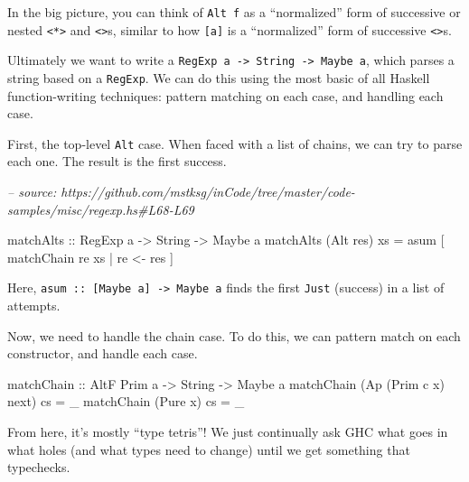 \documentclass[]{article}
\newenvironment{Shaded}{}{}
\newcommand{\CommentTok}[1]{\textcolor[rgb]{0.38,0.63,0.69}{\textit{#1}}}
\newcommand{\DataTypeTok}[1]{\textcolor[rgb]{0.56,0.13,0.00}{#1}}
\newcommand{\FunctionTok}[1]{\textcolor[rgb]{0.02,0.16,0.49}{#1}}
\newcommand{\NormalTok}[1]{#1}
\newcommand{\OtherTok}[1]{\textcolor[rgb]{0.00,0.44,0.13}{#1}}
\begin{document}
In the big picture, you can think of \texttt{Alt\ f} as a ``normalized'' form of
successive or nested \texttt{\textless{}*\textgreater{}} and
\texttt{\textless{}\textbar{}\textgreater{}}s, similar to how \texttt{{[}a{]}}
is a ``normalized'' form of successive \texttt{\textless{}\textgreater{}}s.

Ultimately we want to write a
\texttt{RegExp\ a\ -\textgreater{}\ String\ -\textgreater{}\ Maybe\ a}, which
parses a string based on a \texttt{RegExp}. We can do this using the most basic
of all Haskell function-writing techniques: pattern matching on each case, and
handling each case.

First, the top-level \texttt{Alt} case. When faced with a list of chains, we can
try to parse each one. The result is the first success.

\begin{Shaded}
\begin{Highlighting}[]
\CommentTok{-- source: https://github.com/mstksg/inCode/tree/master/code-samples/misc/regexp.hs#L68-L69}

\OtherTok{matchAlts ::} \DataTypeTok{RegExp}\NormalTok{ a }\OtherTok{->} \DataTypeTok{String} \OtherTok{->} \DataTypeTok{Maybe}\NormalTok{ a}
\NormalTok{matchAlts (}\DataTypeTok{Alt}\NormalTok{ res) xs }\FunctionTok{=}\NormalTok{ asum [ matchChain re xs }\FunctionTok{|}\NormalTok{ re }\OtherTok{<-}\NormalTok{ res  ]}
\end{Highlighting}
\end{Shaded}

Here, \texttt{asum\ ::\ {[}Maybe\ a{]}\ -\textgreater{}\ Maybe\ a} finds the
first \texttt{Just} (success) in a list of attempts.

Now, we need to handle the chain case. To do this, we can pattern match on each
constructor, and handle each case.

\begin{Shaded}
\begin{Highlighting}[]
\OtherTok{matchChain ::} \DataTypeTok{AltF} \DataTypeTok{Prim}\NormalTok{ a }\OtherTok{->} \DataTypeTok{String} \OtherTok{->} \DataTypeTok{Maybe}\NormalTok{ a}
\NormalTok{matchChain (}\DataTypeTok{Ap}\NormalTok{ (}\DataTypeTok{Prim}\NormalTok{ c x) next) cs }\FunctionTok{=}\NormalTok{ _}
\NormalTok{matchChain (}\DataTypeTok{Pure}\NormalTok{ x)             cs }\FunctionTok{=}\NormalTok{ _}
\end{Highlighting}
\end{Shaded}

From here, it's mostly ``type tetris''! We just continually ask GHC what goes in
what holes (and what types need to change) until we get something that
typechecks.
\end{document}
